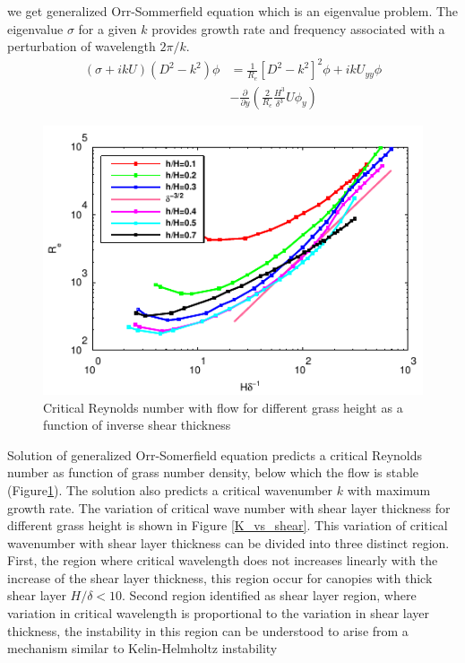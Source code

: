 \documentclass[aps,prl,twocolumn,showpacs,superscriptaddress,groupedaddress,10pt]{revtex4-1}  %
\newcommand{\del}{\partial}
\begin{document}
we get generalized Orr-Sommerfield equation 
which is an eigenvalue problem. The eigenvalue $\sigma$ for a given $k$ provides growth rate and frequency associated with a perturbation of wavelength $2\pi/k$.
\small
\begin{equation}
\begin{split}
\left(\sigma+ikU\right) \left(D^2-k^2\right)\phi &= \frac{1}{R_{e}}\left[D^2 -k^{2} \right]^2\phi +ikU_{yy}\phi \\
&-\frac{\del}{\del y}\left(\frac{2}{R_e}\frac{H^3}{\delta^3}U\phi_y\right)
\label{Orr-somerfield}
\end{split}
\end{equation}
\normalsize
\begin{figure}[htb]
\includegraphics[]{Critical_Re_vs_delta}
\caption{Critical Reynolds number with flow for different grass height as a function of inverse shear thickness}
\label{Re_vs_delta}
\end{figure}
Solution of generalized Orr-Somerfield equation predicts a critical Reynolds number as function of grass number density, below which the flow is stable 
(Figure\ref{Re_vs_delta}). The solution also predicts a critical wavenumber $k$ with maximum growth rate.
The variation of critical wave number with shear layer thickness for different grass height is shown in Figure \ref{K_vs_shear}. This variation of critical 
wavenumber with shear layer thickness can be divided into three distinct region. First, the region where critical wavelength does not increases linearly with the
increase of the shear layer thickness, this region occur for canopies with thick shear layer $H/\delta <10$. Second region identified as shear layer region, where variation in critical
wavelength is proportional to the variation in shear layer thickness, the instability in this region can be understood to arise from a mechanism similar to Kelin-Helmholtz instability 
\end{document}
